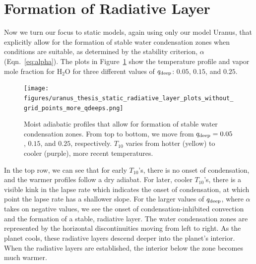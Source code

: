 \documentclass[11pt]{ucscthesisbs}
\begin{document}
\section{Formation of Radiative Layer}
Now we turn our focus to static models, again using only our model Uranus, that explicitly allow for the formation of stable water condensation zones when conditions are suitable, as determined by the stability criterion, $\alpha$ (Eqn.~\ref{eq:alpha}). The plots in Figure~\ref{fig:radiative} show the temperature profile and vapor mole fraction for H$_{2}$O for three different values of $q_{\rm deep}$: $0.05$, $0.15$, and $0.25$. 
\begin{figure}[ht]
 \centerline{
  \texttt{[image: figures/uranus\_thesis\_static\_radiative\_layer\_plots\_without\_grid\_points\_more\_qdeeps.png]}
 }{}
\caption[Formation of Radiative Layer]
{Moist adiabatic profiles that allow for formation of stable water condensation zones. From top to bottom, we move from $q_{\rm deep} = 0.05$, $0.15$, and $0.25$, respectively. $T_{10}$ varies from hotter (yellow) to cooler (purple), more recent temperatures.}
\label{fig:radiative}
\end{figure}
In the top row, we can see that for early $T_{10}$'s, there is no onset of condensation, and the warmer profiles follow a dry adiabat. For later, cooler $T_{10}$'s, there is a visible kink in the lapse rate which indicates the onset of condensation, at which point the lapse rate has a shallower slope. For the larger values of $q_{\rm deep}$, where $\alpha$ takes on negative values, we see the onset of condensation-inhibited convection and the formation of a stable, radiative layer. The water condensation zones ar{}e represented by the horizontal discontinuities moving from left to right. As the planet cools, these radiative layers descend deeper into the planet's interior. When the radiative layers are established, the interior below the zone becomes much warmer. 
\end{document}
